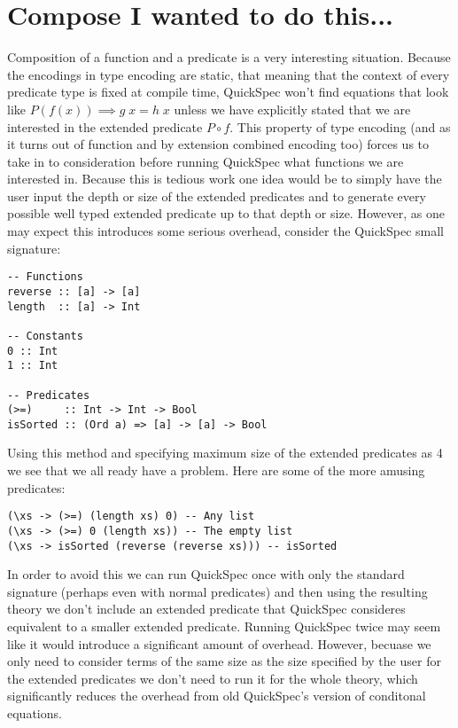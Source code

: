 \section{Compose I wanted to do this...}
Composition of a function and a predicate
is a very interesting situation. Because the
encodings in type encoding are static, that meaning
that the context of every predicate type is fixed
at compile time, QuickSpec won't find equations
that look like $P(f(x))\implies g\;x=h\;x$
unless we have explicitly stated that we are interested
in the extended predicate $P \circ f$. This property of type encoding
(and as it turns out of function and by extension combined encoding too)
forces us to take in to consideration before running QuickSpec
what functions we are interested in. %
Because this is tedious work one idea would be to simply have the user input the depth or size
of the extended predicates and to generate every possible well typed
extended predicate up to that depth or size. However, as one may expect
this introduces some serious overhead, consider the QuickSpec small signature:
\begin{verbatim}
-- Functions
reverse :: [a] -> [a]
length  :: [a] -> Int

-- Constants
0 :: Int
1 :: Int

-- Predicates
(>=)     :: Int -> Int -> Bool 
isSorted :: (Ord a) => [a] -> [a] -> Bool
\end{verbatim}
Using this method and specifying maximum size of the extended predicates as 4
we see that we all ready have a problem. Here are some of the more amusing predicates:
\begin{verbatim}
(\xs -> (>=) (length xs) 0) -- Any list
(\xs -> (>=) 0 (length xs)) -- The empty list
(\xs -> isSorted (reverse (reverse xs))) -- isSorted
\end{verbatim}
In order to avoid this we can run QuickSpec once with only the standard signature (perhaps even with
normal predicates) and then using the resulting theory we don't include an extended predicate
that QuickSpec consideres equivalent to a smaller extended predicate.
Running QuickSpec twice may seem like it would introduce a significant amount of overhead. However,
becuase we only need to consider terms of the same size as the size specified by the user for the
extended predicates we don't need to run it for the whole theory, which significantly reduces the overhead
from old QuickSpec's version of conditonal equations.
